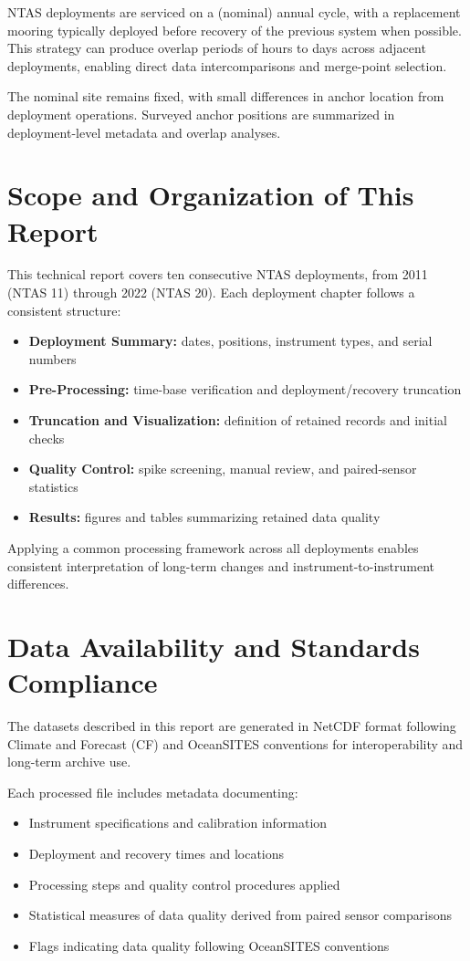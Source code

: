 NTAS deployments are serviced on a (nominal) annual cycle, with a replacement mooring typically deployed before recovery of the previous system when possible. This strategy can produce overlap periods of hours to days across adjacent deployments, enabling direct data intercomparisons and merge-point selection.

The nominal site remains fixed, with small differences in anchor location from deployment operations. Surveyed anchor positions are summarized in deployment-level metadata and overlap analyses.

\section{Scope and Organization of This Report}

This technical report covers ten consecutive NTAS deployments, from 2011 (NTAS 11) through 2022 (NTAS 20). Each deployment chapter follows a consistent structure:

\begin{itemize}
    \item \textbf{Deployment Summary:} dates, positions, instrument types, and serial numbers
    \item \textbf{Pre-Processing:} time-base verification and deployment/recovery truncation
    \item \textbf{Truncation and Visualization:} definition of retained records and initial checks
    \item \textbf{Quality Control:} spike screening, manual review, and paired-sensor statistics
    \item \textbf{Results:} figures and tables summarizing retained data quality
\end{itemize}

Applying a common processing framework across all deployments enables consistent interpretation of long-term changes and instrument-to-instrument differences.

\section{Data Availability and Standards Compliance}

The datasets described in this report are generated in NetCDF format following Climate and Forecast (CF) and OceanSITES conventions for interoperability and long-term archive use.

Each processed file includes metadata documenting:
\begin{itemize}
    \item Instrument specifications and calibration information
    \item Deployment and recovery times and locations
    \item Processing steps and quality control procedures applied
    \item Statistical measures of data quality derived from paired sensor comparisons
    \item Flags indicating data quality following OceanSITES conventions
\end{itemize}

